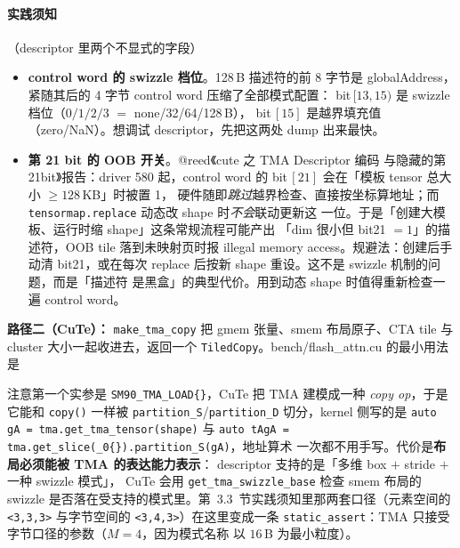 \paragraph{实践须知}（descriptor 里两个不显式的字段）
\begin{itemize}
  \item \textbf{control word 的 swizzle 档位}。128\,B 描述符的前 8 字节是
        globalAddress，紧随其后的 4 字节 control word 压缩了全部模式配置：
        bit$\,[13,15)$ 是 swizzle 档位（$0/1/2/3$ $=$ none/32/64/128\,B），
        bit$\,[15]$ 是越界填充值（zero/NaN）。想调试 descriptor，先把这两处
        dump 出来最快。
  \item \textbf{第 21 bit 的 OOB 开关}。@reed《cute 之 TMA Descriptor 编码
        与隐藏的第 21bit》报告：driver 580 起，control word 的
        bit$\,[21]$ 会在「模板 tensor 总大小 $\ge 128$\,KB」时被置 1，
        硬件随即\emph{跳过}越界检查、直接按坐标算地址；而
        \texttt{tensormap.\allowbreak{}replace} 动态改 shape 时\emph{不会}联动更新这
        一位。于是「创建大模板、运行时缩 shape」这条常规流程可能产出
        「dim 很小但 bit21 $=1$」的描述符，OOB tile 落到未映射页时报
        illegal memory access。规避法：创建后手动清 bit21，或在每次
        replace 后按新 shape 重设。这不是 swizzle 机制的问题，而是「描述符
        是黑盒」的典型代价。用到动态 shape 时值得重新检查一遍 control
        word。
\end{itemize}

\textbf{路径二（CuTe）：} \texttt{make\_\allowbreak{}tma\_\allowbreak{}copy} 把 gmem 张量、smem
布局原子、CTA tile 与 cluster 大小一起收进去，返回一个
\texttt{TiledCopy}。bench/flash\_attn.cu 的最小用法是



注意第一个实参是 \texttt{SM90\_\allowbreak{}TMA\_\allowbreak{}LOAD\{\}}，CuTe 把 TMA 建模成一种
\emph{copy op}，于是它能和 \texttt{copy()} 一样被
\texttt{partition\_S}/\texttt{partition\_D} 切分，kernel 侧写的是
\texttt{auto g\allowbreak{}A =\allowbreak{} tma.\allowbreak{}get\_\allowbreak{}tma\_\allowbreak{}tensor\allowbreak{}(shape)} 与
\texttt{auto t\allowbreak{}Ag\allowbreak{}A =\allowbreak{} tma.\allowbreak{}get\_\allowbreak{}slice\allowbreak{}(\_\allowbreak{}0\{\}).\allowbreak{}partition\_\allowbreak{}S\allowbreak{}(g\allowbreak{}A)}，地址算术
一次都不用手写。代价是\textbf{布局必须能被 TMA 的表达能力表示}：
descriptor 支持的是「多维 box $+$ stride $+$ 一种 swizzle 模式」，
CuTe 会用 \texttt{get\_\allowbreak{}tma\_\allowbreak{}swizzle\_\allowbreak{}base} 检查 smem 布局的 swizzle
是否落在受支持的模式里。第~3.3~节实践须知里那两套口径（元素空间的
\texttt{<3,3,3>} 与字节空间的 \texttt{<3,4,3>}）在这里变成一条
\texttt{static\_\allowbreak{}assert}：TMA 只接受字节口径的参数（$M=4$，因为模式名称
以 $16$\,B 为最小粒度）。

